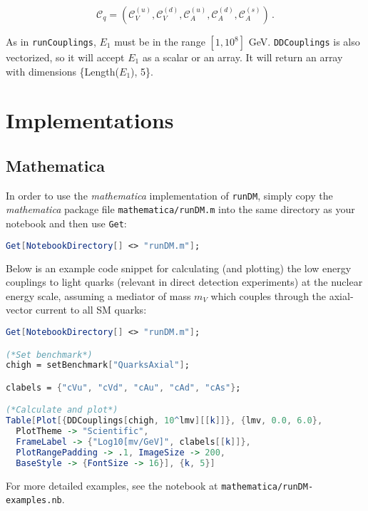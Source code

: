 \documentclass[notitlepage,12pt]{article}
\begin{document}
\begin{equation}
\mathcal{C}_q = \left( \mathcal{C}_V^{(u)}, \mathcal{C}_V^{(d)}, \mathcal{C}_A^{(u)}, \mathcal{C}_A^{(d)}, \mathcal{C}_A^{(s)} \right)\,.
\end{equation}

As in \texttt{runCouplings}, $E_1$ must be in the range $[1, 10^8]$ GeV. \texttt{DDCouplings} is also vectorized, so it will accept $E_1$ as a scalar or an array. It will return an array with dimensions \{Length($E_1$), 5\}.

\section{Implementations}
\label{sec:implementations}

\subsection{Mathematica}

In order to use the \textit{mathematica} implementation of \texttt{runDM}, simply copy the \textit{mathematica} package file \texttt{mathematica/runDM.m} into the same directory as your notebook and then use \texttt{Get}:

\begin{lstlisting}[language=mathematica]
Get[NotebookDirectory[] <> "runDM.m"];
\end{lstlisting}

Below is an example code snippet for calculating (and plotting) the low energy couplings to light quarks (relevant in direct detection experiments) at the nuclear energy scale, assuming a mediator of mass $m_V$ which couples through the axial-vector current to all SM quarks:

\begin{lstlisting}[language=mathematica]
Get[NotebookDirectory[] <> "runDM.m"];

(*Set benchmark*)
chigh = setBenchmark["QuarksAxial"];

clabels = {"cVu", "cVd", "cAu", "cAd", "cAs"};

(*Calculate and plot*)
Table[Plot[{DDCouplings[chigh, 10^lmv][[k]]}, {lmv, 0.0, 6.0}, 
  PlotTheme -> "Scientific", 
  FrameLabel -> {"Log10[mv/GeV]", clabels[[k]]}, 
  PlotRangePadding -> .1, ImageSize -> 200, 
  BaseStyle -> {FontSize -> 16}], {k, 5}]
\end{lstlisting}
For more detailed examples, see the notebook at \texttt{mathematica/runDM-examples.nb}.
\end{document}
